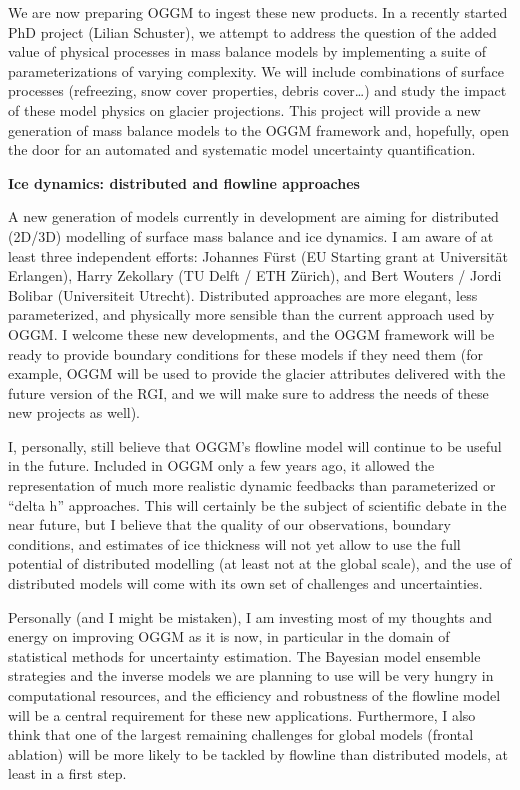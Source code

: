 We are now preparing OGGM to ingest these new products. In a recently started PhD project
(Lilian Schuster), we attempt to address the question of the added value of physical processes in mass balance models
by implementing a suite of parameterizations of varying complexity. We will include combinations of surface processes
(refreezing, snow cover properties, debris cover…) and study the impact of these model physics on glacier projections.
This project will provide a new generation of mass balance models to the OGGM framework and, hopefully, open the door for an
automated and systematic model uncertainty quantification.

\textbf{Ice dynamics: distributed and flowline approaches}

A new generation of models currently in development are aiming for distributed (2D/3D) modelling of surface mass balance
and ice dynamics. I am aware of at least three independent efforts: Johannes
Fürst (EU Starting grant at Universität Erlangen), Harry Zekollary (TU Delft / ETH Zürich), and Bert Wouters / Jordi Bolibar
(Universiteit Utrecht). Distributed approaches are more elegant, less parameterized, and physically more sensible than
the current approach used by OGGM. I welcome these new developments, and the OGGM framework will
be ready to provide boundary conditions for these models if they need them (for example, OGGM will be used to provide
the glacier attributes delivered with the future version of the RGI, and we will make sure to address the needs of these
new projects as well).

I, personally, still believe that OGGM’s flowline model will continue to be useful in the future. Included in OGGM
only a few years ago, it allowed the representation of much more realistic dynamic feedbacks than parameterized or
“delta h” approaches. This will certainly be the subject of scientific debate in the near future,
but I believe that the quality of our observations, boundary conditions, and estimates of ice thickness will not yet
allow to use the full potential of distributed modelling (at least not at the global scale), and the use of distributed
models will come with its own set of challenges and uncertainties.

Personally (and I might be mistaken), I am investing most of my thoughts and energy on improving OGGM as it is now,
in particular in the domain of statistical methods for uncertainty estimation. The Bayesian model ensemble strategies
and the inverse models we are planning to use will be very hungry in computational resources, and the efficiency and
robustness of the flowline model will be a central requirement for these new applications.
Furthermore, I also think that one of the largest remaining challenges for global models (frontal ablation)
will be more likely to be tackled by flowline than distributed models, at least in a first step.

